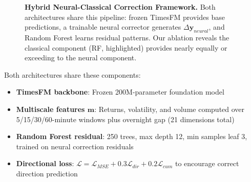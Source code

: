 \documentclass[10pt,conference]{IEEEtran}
\newcommand{\rev}[1]{#1}
\begin{document}
\begin{figure}[t]
{
}
\caption{\textbf{Hybrid Neural-Classical Correction Framework.} Both architectures share this pipeline: frozen TimesFM provides base predictions, a trainable neural corrector generates $\Delta\mathbf{y}_{neural}$, and Random Forest learns residual patterns. Our ablation reveals the classical component (RF, highlighted) \rev{provides nearly equally or exceeding to the neural component}.}
\label{fig:framework}
\end{figure}

Both architectures share these components:
\begin{itemize}
    \item \textbf{TimesFM backbone}: Frozen 200M-parameter foundation model
    \item \textbf{Multiscale features $\mathbf{m}$}: Returns, volatility, and volume computed over 5/15/30/60-minute windows plus overnight gap (21 dimensions total)
    \item \textbf{Random Forest residual}: 250 trees, max depth 12, min samples leaf 3, trained on neural correction residuals
    \item \textbf{Directional loss}: $\mathcal{L} = \mathcal{L}_{MSE} + 0.3\mathcal{L}_{dir} + 0.2\mathcal{L}_{cum}$ to encourage correct direction prediction
\end{itemize}
\end{document}
